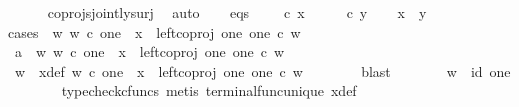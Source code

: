 \begin{isabellebody}
\ \ \ \ \isamarkupfalse%
\ coprojs{\isacharunderscore}{\kern0pt}jointly{\isacharunderscore}{\kern0pt}surj\ \isamarkupfalse%
\ auto\isanewline
\isanewline
\ \ \isamarkupfalse%
\ eqs{\isacharcolon}{\kern0pt}\ {\isachardoublequoteopen}{\isasymlangle}{\isasymt}{\isacharcomma}{\kern0pt}\ {\isasymt}{\isasymrangle}\ {\isasymamalg}{\isasymlangle}{\isasymf}{\isacharcomma}{\kern0pt}\ {\isasymf}{\isasymrangle}\ {\isasymcirc}\isactrlsub c\ x\ {\isacharequal}{\kern0pt}\ {\isasymlangle}{\isasymt}{\isacharcomma}{\kern0pt}\ {\isasymt}{\isasymrangle}\ {\isasymamalg}{\isasymlangle}{\isasymf}{\isacharcomma}{\kern0pt}\ {\isasymf}{\isasymrangle}\ {\isasymcirc}\isactrlsub c\ y{\isachardoublequoteclose}\isanewline
\isanewline
\ \ \isamarkupfalse%
\ {\isachardoublequoteopen}x\ {\isacharequal}{\kern0pt}\ y{\isachardoublequoteclose}\isanewline
\ \ \isamarkupfalse%
{\isacharparenleft}{\kern0pt}cases\ {\isachardoublequoteopen}{\isasymexists}\ w{\isachardot}{\kern0pt}\ w\ {\isasymin}\isactrlsub c\ one\ {\isasymand}\ x\ {\isacharequal}{\kern0pt}\ left{\isacharunderscore}{\kern0pt}coproj\ one\ one\ {\isasymcirc}\isactrlsub c\ w{\isachardoublequoteclose}{\isacharparenright}{\kern0pt}\isanewline
\ \ \ \ \isamarkupfalse%
\ a{}{\isacharcolon}{\kern0pt}\ {\isachardoublequoteopen}{\isasymexists}\ w{\isachardot}{\kern0pt}\ w\ {\isasymin}\isactrlsub c\ one\ {\isasymand}\ x\ {\isacharequal}{\kern0pt}\ left{\isacharunderscore}{\kern0pt}coproj\ one\ one\ {\isasymcirc}\isactrlsub c\ w{\isachardoublequoteclose}\isanewline
\ \ \ \ \isamarkupfalse%
\ \isamarkupfalse%
\ w\ \ x{\isacharunderscore}{\kern0pt}def{\isacharcolon}{\kern0pt}\ {\isachardoublequoteopen}w\ {\isasymin}\isactrlsub c\ one\ {\isasymand}\ x\ {\isacharequal}{\kern0pt}\ left{\isacharunderscore}{\kern0pt}coproj\ one\ one\ {\isasymcirc}\isactrlsub c\ w{\isachardoublequoteclose}\isanewline
\ \ \ \ \ \ \isamarkupfalse%
\ blast\isanewline
\ \ \ \ \isamarkupfalse%
\ \isamarkupfalse%
\ {\isachardoublequoteopen}w\ {\isacharequal}{\kern0pt}\ id\ one{\isachardoublequoteclose}\isanewline
\ \ \ \ \ \ \isamarkupfalse%
\ {\isacharparenleft}{\kern0pt}typecheck{\isacharunderscore}{\kern0pt}cfuncs{\isacharcomma}{\kern0pt}\ metis\ terminal{\isacharunderscore}{\kern0pt}func{\isacharunderscore}{\kern0pt}unique\ x{\isacharunderscore}{\kern0pt}def{\isacharparenright}{\kern0pt}\isanewline
\ \ \ \ \isamarkupfalse%

\end{isabellebody}
